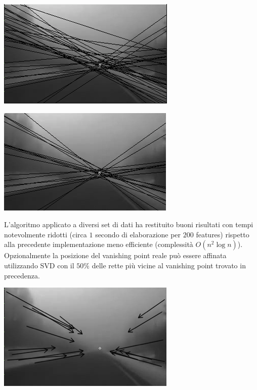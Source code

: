 \documentclass[12pt]{report}
\begin{document}
\begin{center}
	\includegraphics[scale=0.50]{images/iaasBefore.png}
	\label{fig:vpBef}
\end{center}
\begin{center}
	\includegraphics[scale=0.50]{images/iaasAfter.png}
	\label{fig:vpAft}
\end{center}

\noindent L'algoritmo applicato a diversi set di dati ha restituito buoni risultati con tempi notevolmente ridotti (circa $1$ secondo di elaborazione per $200$ features) rispetto alla precedente implementazione meno efficiente (complessit\`a $O\left(n^2\log{n}\right)$).\\

\noindent Opzionalmente la posizione del vanishing point reale pu\`o essere affinata utilizzando SVD con il $50\%$ delle rette pi\`u vicine al vanishing point trovato in precedenza.\\

\begin{center}
	\includegraphics[scale=0.50]{images/iaasAfterArrow.png}
	\label{fig:vpAftArr}
\end{center}
\end{document}
